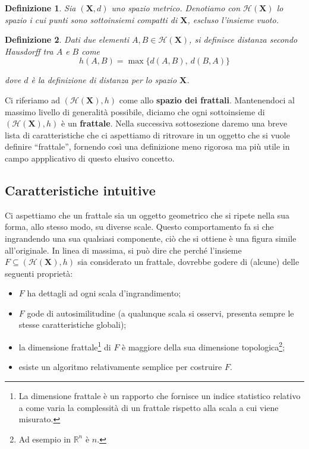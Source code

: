 \documentclass[11pt,a4paper,appendixprefix=true,numbers=noenddot]{scrreprt}
\newtheorem{definizione}{Definizione}
\begin{document}
\begin{definizione}
Sia $(\mathbf{X}, d)$ uno spazio metrico. Denotiamo con $\mathcal{H}(\mathbf{X})$ lo spazio i cui punti sono sottoinsiemi compatti di $\mathbf{X}$, escluso l'insieme vuoto.
\end{definizione}

\begin{definizione}
Dati due elementi $A, B \in \mathcal{H}(\mathbf{X})$, si definisce \emph{distanza secondo Hausdorff} tra $A$ e $B$ come
\[
h(A,B) = \max\{ d(A,B), ~ d(B,A) \}
\]

dove $d$ è la definizione di distanza per lo spazio $\mathbf{X}$.
\end{definizione}

Ci riferiamo ad $(\mathcal{H}(\mathbf{X}), h)$ come allo \textbf{spazio dei frattali}. Mantenendoci al massimo livello di generalità possibile, diciamo che ogni sottoinsieme di $(\mathcal{H}(\mathbf{X}), h)$ è un \textbf{frattale}. Nella successiva sottosezione daremo una breve lista di caratteristiche che ci aspettiamo di ritrovare in un oggetto che si vuole definire ``frattale'', fornendo così una definizione meno rigorosa ma più utile in campo appplicativo di questo elusivo concetto.

\subsection*{Caratteristiche intuitive}

Ci aspettiamo che un frattale sia un oggetto geometrico che si ripete nella sua forma, allo stesso modo, su diverse scale. Questo comportamento fa si che ingrandendo una sua qualsiasi componente, ciò che si ottiene è una figura simile all'originale. In linea di massima, si può dire che perché l'insieme $F \subseteq (\mathcal{H}(\mathbf{X}), h)$ sia considerato un frattale, dovrebbe godere di (alcune) delle seguenti proprietà:

\begin{itemize}
\item $F$ ha dettagli ad ogni scala d'ingrandimento;
\item $F$ gode di autosimilitudine (a qualunque scala si osservi, presenta sempre le stesse caratteristiche globali);
\item la dimensione frattale\footnote{La dimensione frattale è un rapporto che fornisce un indice statistico relativo a come varia la complessità di un frattale rispetto alla scala a cui viene misurato.} di $F$ è maggiore della sua dimensione topologica\footnote{Ad esempio in $\mathbb{R}^n$ è $n$.};
\item esiste un algoritmo relativamente semplice per costruire $F$.
\end{itemize}
\end{document}
